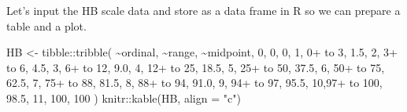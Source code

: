 \documentclass[
  letterpaper,
  DIV=11,
  numbers=noendperiod]{scrreprt}
\newenvironment{Shaded}{\begin{snugshade}}{\end{snugshade}}
\newcommand{\AttributeTok}[1]{\textcolor[rgb]{0.40,0.45,0.13}{#1}}
\newcommand{\DecValTok}[1]{\textcolor[rgb]{0.68,0.00,0.00}{#1}}
\newcommand{\FloatTok}[1]{\textcolor[rgb]{0.68,0.00,0.00}{#1}}
\newcommand{\FunctionTok}[1]{\textcolor[rgb]{0.28,0.35,0.67}{#1}}
\newcommand{\NormalTok}[1]{\textcolor[rgb]{0.00,0.23,0.31}{#1}}
\newcommand{\OtherTok}[1]{\textcolor[rgb]{0.00,0.23,0.31}{#1}}
\newcommand{\SpecialCharTok}[1]{\textcolor[rgb]{0.37,0.37,0.37}{#1}}
\newcommand{\StringTok}[1]{\textcolor[rgb]{0.13,0.47,0.30}{#1}}
\begin{document}
Let's input the HB scale data and store as a data frame in R so we can
prepare a table and a plot.

\begin{Shaded}
\begin{Highlighting}[]
\NormalTok{HB }\OtherTok{\textless{}{-}}\NormalTok{ tibble}\SpecialCharTok{::}\FunctionTok{tribble}\NormalTok{(}
  \SpecialCharTok{\textasciitilde{}}\NormalTok{ordinal, }\SpecialCharTok{\textasciitilde{}}\StringTok{\textquotesingle{}range\textquotesingle{}}\NormalTok{, }\SpecialCharTok{\textasciitilde{}}\NormalTok{midpoint,}
  \DecValTok{0}\NormalTok{,          }\StringTok{\textquotesingle{}0\textquotesingle{}}\NormalTok{,    }\DecValTok{0}\NormalTok{,   }
  \DecValTok{1}\NormalTok{,    }\StringTok{\textquotesingle{}0+ to 3\textquotesingle{}}\NormalTok{,  }\FloatTok{1.5}\NormalTok{,   }
  \DecValTok{2}\NormalTok{,    }\StringTok{\textquotesingle{}3+ to 6\textquotesingle{}}\NormalTok{,  }\FloatTok{4.5}\NormalTok{,   }
  \DecValTok{3}\NormalTok{,   }\StringTok{\textquotesingle{}6+ to 12\textquotesingle{}}\NormalTok{,  }\FloatTok{9.0}\NormalTok{,  }
  \DecValTok{4}\NormalTok{,  }\StringTok{\textquotesingle{}12+ to 25\textquotesingle{}}\NormalTok{, }\FloatTok{18.5}\NormalTok{, }
  \DecValTok{5}\NormalTok{,  }\StringTok{\textquotesingle{}25+ to 50\textquotesingle{}}\NormalTok{, }\FloatTok{37.5}\NormalTok{, }
  \DecValTok{6}\NormalTok{,  }\StringTok{\textquotesingle{}50+ to 75\textquotesingle{}}\NormalTok{, }\FloatTok{62.5}\NormalTok{, }
  \DecValTok{7}\NormalTok{,  }\StringTok{\textquotesingle{}75+ to 88\textquotesingle{}}\NormalTok{, }\FloatTok{81.5}\NormalTok{, }
  \DecValTok{8}\NormalTok{,  }\StringTok{\textquotesingle{}88+ to 94\textquotesingle{}}\NormalTok{, }\FloatTok{91.0}\NormalTok{, }
  \DecValTok{9}\NormalTok{,  }\StringTok{\textquotesingle{}94+ to 97\textquotesingle{}}\NormalTok{, }\FloatTok{95.5}\NormalTok{, }
  \DecValTok{10}\NormalTok{,}\StringTok{\textquotesingle{}97+ to 100\textquotesingle{}}\NormalTok{, }\FloatTok{98.5}\NormalTok{,  }
  \DecValTok{11}\NormalTok{,      }\StringTok{\textquotesingle{}100\textquotesingle{}}\NormalTok{,   }\DecValTok{100} 
\NormalTok{  )}
\NormalTok{knitr}\SpecialCharTok{::}\FunctionTok{kable}\NormalTok{(HB, }\AttributeTok{align =} \StringTok{"c"}\NormalTok{)}
\end{Highlighting}
\end{Shaded}
\end{document}
